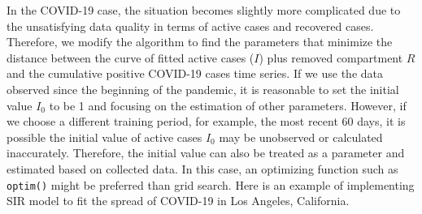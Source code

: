 \documentclass[]{book}
\begin{document}
In the COVID-19 case, the situation becomes slightly more complicated
due to the unsatisfying data quality in terms of active cases and
recovered cases. Therefore, we modify the algorithm to find the
parameters that minimize the distance between the curve of fitted active
cases (\(I\)) plus removed compartment \(R\) and the cumulative positive
COVID-19 cases time series. If we use the data observed since the
beginning of the pandemic, it is reasonable to set the initial value
\(I_{0}\) to be 1 and focusing on the estimation of other parameters.
However, if we choose a different training period, for example, the most
recent 60 days, it is possible the initial value of active cases
\(I_{0}\) may be unobserved or calculated inaccurately. Therefore, the
initial value can also be treated as a parameter and estimated based on
collected data. In this case, an optimizing function such as
\texttt{optim()} might be preferred than grid search. Here is an example
of implementing SIR model to fit the spread of COVID-19 in Los Angeles,
California.
\end{document}
